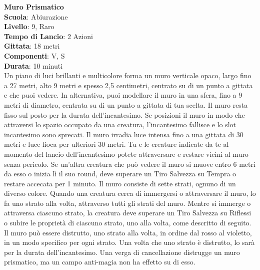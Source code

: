 \begin{multicols}{2}
\medskip\textbf{Muro Prismatico}\\
\textbf{Scuola}: Abiurazione\\
\textbf{Livello}: 9, Raro\\
\textbf{Tempo di Lancio}: 2 Azioni\\
\textbf{Gittata}: 18 metri\\
\textbf{Componenti}: V, S\\
\textbf{Durata}: 10 minuti\\
Un piano di luci brillanti e multicolore forma un muro verticale opaco, largo fino a 27 metri, alto 9 metri e spesso 2,5 centimetri, centrato su di un punto a gittata e che puoi vedere. In alternativa, puoi modellare il muro in una sfera, fino a 9 metri di diametro, centrata su di un punto a gittata di tua scelta. Il muro resta fisso sul posto per la durata dell'incantesimo. Se posizioni il muro in modo che attraversi lo spazio occupato da una creatura, l'incantesimo fallisce e lo slot incantesimo sono sprecati. Il muro irradia luce intensa fino a una gittata di 30 metri e luce fioca per ulteriori 30 metri. Tu e le creature indicate da te al momento del lancio dell'incantesimo potete attraversare e restare vicini al muro senza pericolo. Se un'altra creatura che può vedere il muro si muove entro 6 metri da esso o inizia lì il suo round, deve superare un Tiro Salvezza su Tempra o restare accecata per 1 minuto. Il muro consiste di sette strati, ognuno di un diverso colore. Quando una creatura cerca di immergersi o attraversare il muro, lo fa uno strato alla volta, attraverso tutti gli strati del muro. Mentre si immerge o attraversa ciascuno strato, la creatura deve superare un Tiro Salvezza su Riflessi o subire le proprietà di ciascuno strato, uno alla volta, come descritto di seguito.\\
Il muro può essere distrutto, uno strato alla volta, in ordine dal rosso al violetto, in un modo specifico per ogni strato. Una volta che uno strato è distrutto, lo sarà per la durata dell'incantesimo. Una verga di cancellazione distrugge un muro prismatico, ma un campo anti-magia non ha effetto su di esso.\\


\end{multicols}
